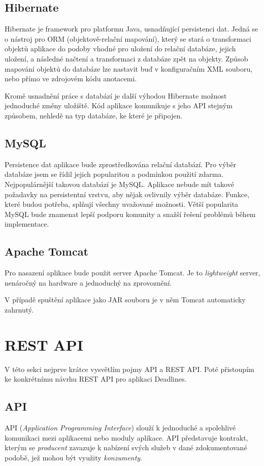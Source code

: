 \documentclass[thesis=B,czech]{FITthesis}[2012/06/26]
\begin{document}
		\subsection{Hibernate}
			Hibernate \cite{hibernate} je framework pro platformu Java, usnadňující persistenci dat. Jedná se o nástroj pro ORM (objektově-relační mapování), který se stará o transformaci objektů aplikace do podoby vhodné pro uložení do relační databáze, jejich uložení, a následné načtení a transformaci z databáze zpět na objekty. Způsob mapování objektů do databáze lze nastavit buď v konfiguračním XML souboru, nebo přímo ve zdrojovém kódu anotacemi.
			
			Kromě usnadnění práce s databází je další výhodou Hibernate možnost jednoduché změny uložiště. Kód aplikace komunikuje s jeho API stejným způsobem, nehledě na typ databáze, ke které je připojen.
		
		\subsection{MySQL}
			Persistence dat aplikace bude zprostředkována relační databází. Pro výběr databáze jsem se řídil jejich popularitou a podmínkou použití zdarma. Nejpopulárnější takovou databází je MySQL. \cite{db-ranking} Aplikace nebude mít takové požadavky na persistentní vrstvu, aby nějak ovlivnily výběr databáze. Funkce, které budou potřeba, splňují všechny uvažované možnosti. Větší popularita MySQL bude znamenat lepší podporu komunity a snažší řešení problémů během implementace.
			
		\subsection{Apache Tomcat}
			Pro nasazení aplikace bude použit server Apache Tomcat. \cite{tomcat} Je to \textit{lightweight} server, nenáročný na hardware a jednoduchý na zprovoznění. 
			
			V případě spuštění aplikace jako JAR souboru je v něm Tomcat automaticky zahrnutý.
	
	\section{REST API}
		V této sekci nejprve krátce vysvětlím pojmy API a REST API. Poté přistoupím ke konkrétnímu návrhu REST API pro aplikaci Deadlines.
	
		\subsection{API}
			API (\textit{Application Programming Interface}) slouží k jednoduché a spolehlivé komunikaci mezi aplikacemi nebo moduly aplikace. API představuje kontrakt, kterým se \textit{producent} zavazuje k nabízení svých služeb v dané zdokumentované podobě, jež mohou být využity \textit{konzumenty}.
			
\end{document}
